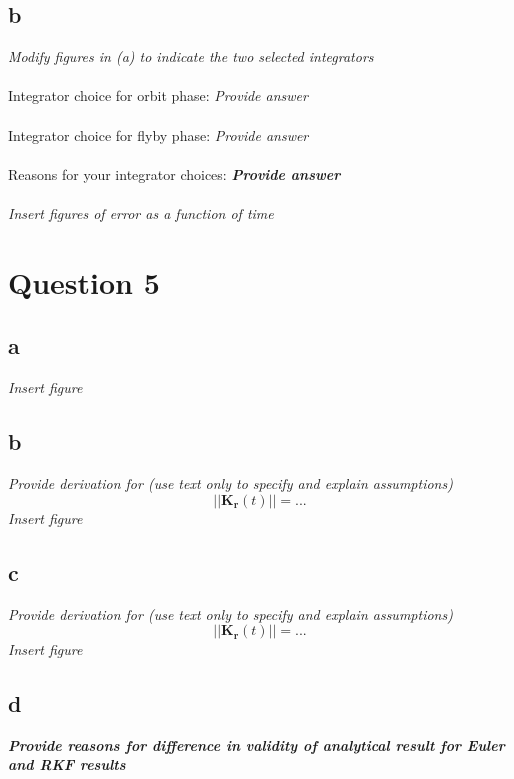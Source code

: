 \documentclass{report}
\begin{document}
\subsection*{b}
\textit{Modify figures in (a) to indicate the two selected integrators}\\
\\
Integrator choice for orbit phase: \textit{Provide answer}\\
\\
Integrator choice for flyby phase: 
\textit{Provide answer}\\
\\
Reasons for your integrator choices:
\textit{\textbf{Provide answer}}\\
\\
\textit{Insert figures of error as a function of time}

\clearpage
\section*{Question 5}
\subsection*{a}
\textit{Insert figure}
\subsection*{b}
\textit{Provide derivation for (use text only to specify and explain assumptions)}
\begin{equation}
||\mathbf{K}_{\mathbf{r}}(t)||=... 
\end{equation}
\textit{Insert figure}
\subsection*{c}
\textit{Provide derivation for (use text only to specify and explain assumptions)}
\begin{equation}
||\mathbf{K}_{\mathbf{r}}(t)||=... 
\end{equation}
\textit{Insert figure}
\subsection*{d}
\textit{\textbf{Provide reasons for difference in validity of analytical result for Euler and RKF results}}\\
\end{document}
